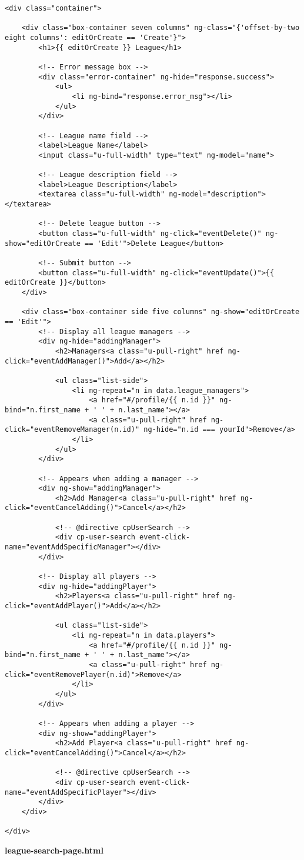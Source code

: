 {\scriptsize
\begin{lstlisting}
<div class="container">

	<div class="box-container seven columns" ng-class="{'offset-by-two eight columns': editOrCreate == 'Create'}">
		<h1>{{ editOrCreate }} League</h1>

		<!-- Error message box -->
		<div class="error-container" ng-hide="response.success">
			<ul>
				<li ng-bind="response.error_msg"></li>
			</ul>
		</div>

		<!-- League name field -->
		<label>League Name</label>
		<input class="u-full-width" type="text" ng-model="name">

		<!-- League description field -->
		<label>League Description</label>
		<textarea class="u-full-width" ng-model="description"></textarea>

		<!-- Delete league button -->
		<button class="u-full-width" ng-click="eventDelete()" ng-show="editOrCreate == 'Edit'">Delete League</button>

		<!-- Submit button -->
		<button class="u-full-width" ng-click="eventUpdate()">{{ editOrCreate }}</button>
	</div>

	<div class="box-container side five columns" ng-show="editOrCreate == 'Edit'">
		<!-- Display all league managers -->
		<div ng-hide="addingManager">
			<h2>Managers<a class="u-pull-right" href ng-click="eventAddManager()">Add</a></h2>

			<ul class="list-side">
				<li ng-repeat="n in data.league_managers">
					<a href="#/profile/{{ n.id }}" ng-bind="n.first_name + ' ' + n.last_name"></a>
					<a class="u-pull-right" href ng-click="eventRemoveManager(n.id)" ng-hide="n.id === yourId">Remove</a>
				</li>
			</ul>
		</div>

		<!-- Appears when adding a manager -->
		<div ng-show="addingManager">
			<h2>Add Manager<a class="u-pull-right" href ng-click="eventCancelAdding()">Cancel</a></h2>

			<!-- @directive cpUserSearch -->
			<div cp-user-search event-click-name="eventAddSpecificManager"></div>
		</div>

		<!-- Display all players -->
		<div ng-hide="addingPlayer">
			<h2>Players<a class="u-pull-right" href ng-click="eventAddPlayer()">Add</a></h2>

			<ul class="list-side">
				<li ng-repeat="n in data.players">
					<a href="#/profile/{{ n.id }}" ng-bind="n.first_name + ' ' + n.last_name"></a>
					<a class="u-pull-right" href ng-click="eventRemovePlayer(n.id)">Remove</a>
				</li>
			</ul>
		</div>

		<!-- Appears when adding a player -->
		<div ng-show="addingPlayer">
			<h2>Add Player<a class="u-pull-right" href ng-click="eventCancelAdding()">Cancel</a></h2>

			<!-- @directive cpUserSearch -->
			<div cp-user-search event-click-name="eventAddSpecificPlayer"></div>
		</div>
	</div>

</div>\end{lstlisting}
}
\textbf{league-search-page.html}\label{league-search-page.html}

